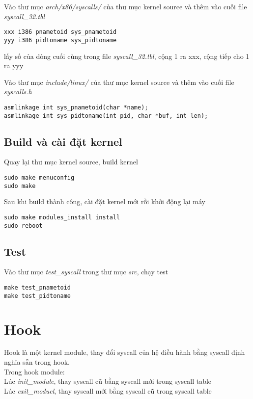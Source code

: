 \documentclass[12pt]{article}
\begin{document}
Vào thư mục \textit{arch/x86/syscalls/} của thư mục kernel source
và thêm vào cuối file \textit{syscall\_32.tbl}
\begin{lstlisting}
xxx i386 pnametoid sys_pnametoid
yyy i386 pidtoname sys_pidtoname
\end{lstlisting}
lấy số của dòng cuối cùng trong file \textit{syscall\_32.tbl}, cộng 1 ra xxx, cộng tiếp cho 1 ra yyy

Vào thư mục \textit{include/linux/} của thư mục kernel source
và thêm vào cuối file \textit{syscalls.h}
\begin{lstlisting}
asmlinkage int sys_pnametoid(char *name);
asmlinkage int sys_pidtoname(int pid, char *buf, int len);
\end{lstlisting}

\subsection{Build và cài đặt kernel}
Quay lại thư mục kernel source, build kernel
\begin{lstlisting}
sudo make menuconfig
sudo make
\end{lstlisting}

Sau khi build thành công, cài đặt kernel mới rồi khởi động lại máy
\begin{lstlisting}
sudo make modules_install install
sudo reboot
\end{lstlisting}

\subsection{Test}
Vào thư mục \textit{test\_syscall} trong thư mục \textit{src}, chạy test
\begin{lstlisting}
make test_pnametoid
make test_pidtoname
\end{lstlisting}

\section{Hook}
Hook là một kernel module, thay đổi syscall của hệ điều hành bằng syscall định nghĩa sẵn trong hook. \\
Trong hook module: \\
Lúc \textit{init\_module}, thay syscall cũ bằng syscall mới trong syscall table \\
Lúc \textit{exit\_moduel}, thay syscall mới bằng syscall cũ trong syscall table \\
\end{document}
